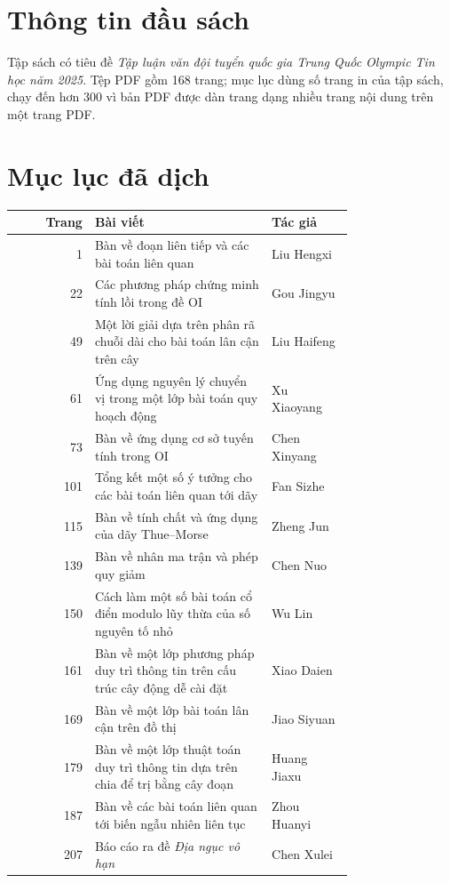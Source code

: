 \documentclass[11pt]{article}
\begin{document}
\section{Thông tin đầu sách}

Tập sách có tiêu đề \emph{Tập luận văn đội tuyển quốc gia Trung Quốc Olympic
Tin học năm 2025}. Tệp PDF gồm 168 trang; mục lục dùng số trang in của tập
sách, chạy đến hơn 300 vì bản PDF được dàn trang dạng nhiều trang nội dung trên
một trang PDF.

\section{Mục lục đã dịch}

\begin{center}
\small
\begin{tabular}{r p{0.52\linewidth} p{0.24\linewidth}}
\textbf{Trang} & \textbf{Bài viết} & \textbf{Tác giả} \\
\hline
1 & Bàn về đoạn liên tiếp và các bài toán liên quan & Liu Hengxi \\
22 & Các phương pháp chứng minh tính lồi trong đề OI & Gou Jingyu \\
49 & Một lời giải dựa trên phân rã chuỗi dài cho bài toán lân cận trên cây & Liu Haifeng \\
61 & Ứng dụng nguyên lý chuyển vị trong một lớp bài toán quy hoạch động & Xu Xiaoyang \\
73 & Bàn về ứng dụng cơ sở tuyến tính trong OI & Chen Xinyang \\
101 & Tổng kết một số ý tưởng cho các bài toán liên quan tới dãy & Fan Sizhe \\
115 & Bàn về tính chất và ứng dụng của dãy Thue--Morse & Zheng Jun \\
139 & Bàn về nhân ma trận và phép quy giảm & Chen Nuo \\
150 & Cách làm một số bài toán cổ điển modulo lũy thừa của số nguyên tố nhỏ & Wu Lin \\
161 & Bàn về một lớp phương pháp duy trì thông tin trên cấu trúc cây động dễ cài đặt & Xiao Daien \\
169 & Bàn về một lớp bài toán lân cận trên đồ thị & Jiao Siyuan \\
179 & Bàn về một lớp thuật toán duy trì thông tin dựa trên chia để trị bằng cây đoạn & Huang Jiaxu \\
187 & Bàn về các bài toán liên quan tới biến ngẫu nhiên liên tục & Zhou Huanyi \\
207 & Báo cáo ra đề \emph{Địa ngục vô hạn} & Chen Xulei \\

\end{tabular}
\end{center}
\end{document}
